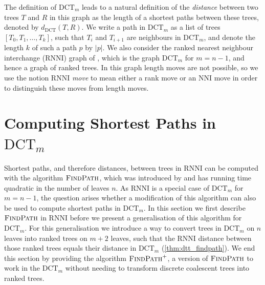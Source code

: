 \documentclass[11pt]{amsart}
\newcommand{\rnni}{\mathrm{RNNI}}
\newcommand{\findpath}{\textsc{FindPath}}
\newcommand{\nni}{\mathrm{NNI}}
\newcommand{\dct}{\mathrm{DCT}}
\newcommand{\summary}[1]{} %
\begin{document}
The definition of $\dct_m$ leads to a natural definition of the \emph{distance} between two trees $T$ and $R$ in this graph as the length of a shortest paths between these trees, denoted by $d_{\dct}(T,R)$.
We write a path in $\dct_m$ as a list of trees $[T_0, T_1, \ldots, T_k]$, such that $T_i$ and $T_{i+1}$ are neighbours in $\dct_m$, and denote the length $k$ of such a path $p$ by $|p|$.
We also consider the ranked nearest neighbour interchange ($\rnni$) graph of \textcite{Collienne2021}, which is the graph $\dct_m$ for $m=n-1$, and hence a graph of ranked trees.
In this graph length moves are not possible, so we use the notion $\rnni$ \emph{move} to mean either a rank move or an $\nni$ move in order to distinguish these moves from length moves.


\section{Computing Shortest Paths in $\dct_m$}
\label{section:fp_dtt}

\summary{Introduce how we can use $\findpath$ to compute $\dct_m$ distances}
Shortest paths, and therefore distances, between trees in $\rnni$ can be computed with the algorithm $\findpath$, which was introduced by \textcite{Collienne2021} and has running time quadratic in the number of leaves $n$.
As $\rnni$ is a special case of $\dct_m$ for $m = n-1$, the question arises whether a modification of this algorithm can also be used to compute shortest paths in $\dct_m$.
In this section we first describe $\findpath$ in $\rnni$ before we present a generalisation of this algorithm for $\dct_m$.
For this generalisation we introduce a way to convert trees in $\dct_m$ on $n$ leaves into ranked trees on $m+2$ leaves, such that the $\rnni$ distance between those ranked trees equals their distance in $\dct_m$ (\autoref{thm:dtt_findpath}).
We end this section by providing the algorithm $\findpath^+$, a version of $\findpath$ to work in the $\dct_m$ without needing to transform discrete coalescent trees into ranked trees.
\end{document}
